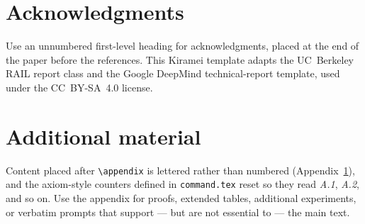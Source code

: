 \documentclass[11pt,letterpaper,twocolumn]{template/style}
\begin{document}
\section*{Acknowledgments}

Use an unnumbered first-level heading for acknowledgments, placed at the end of
the paper before the references. This Kiramei template adapts the UC~Berkeley RAIL
report class and the Google DeepMind technical-report template, used under the
CC~BY-SA~4.0 license.


{\raggedright


}

\newpage
\appendix
\section{Additional material}
\label{app:extra}

Content placed after \verb+\appendix+ is lettered rather than numbered
(Appendix~\ref{app:extra}), and the axiom-style counters defined in
\verb+command.tex+ reset so they read \textit{A.1}, \textit{A.2}, and so on. Use
the appendix for proofs, extended tables, additional experiments, or verbatim
prompts that support --- but are not essential to --- the main text.
\end{document}
